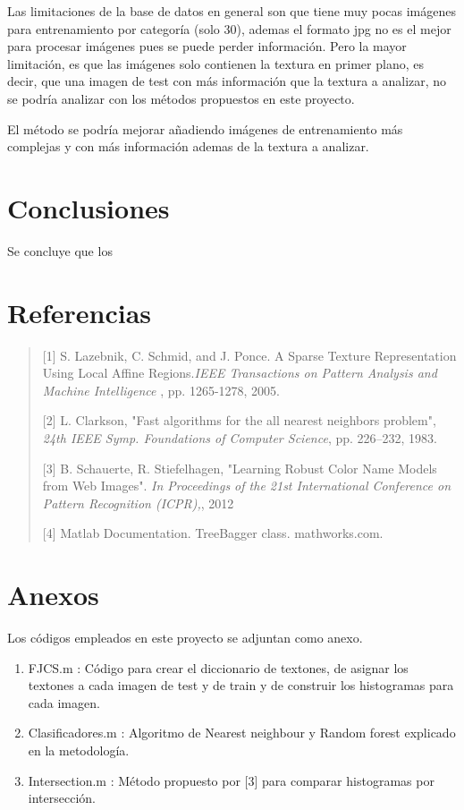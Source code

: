 \documentclass[10pt,twocolumn,letterpaper]{article}
\begin{document}
Las limitaciones de la base de datos en general son que tiene muy pocas imágenes para entrenamiento por categoría (solo 30), ademas el formato jpg no es el mejor para procesar imágenes pues se puede perder información. Pero la mayor limitación, es que las imágenes solo contienen la textura en primer plano, es decir, que una imagen de test con más información que la textura a analizar, no se podría analizar con los métodos propuestos en este proyecto.  

El método se podría mejorar añadiendo imágenes de entrenamiento más complejas y con más información ademas de la textura a analizar. 


\section{Conclusiones}

Se concluye que los 


\section{Referencias}

\begin{quote}
   
[1] S. Lazebnik, C. Schmid, and J. Ponce. A Sparse Texture Representation Using Local Affine Regions.\textit{IEEE Transactions on Pattern Analysis and Machine Intelligence} ,  pp. 1265-1278, 2005.
   
   [2] L. Clarkson, "Fast algorithms for the all nearest neighbors problem", \textit{24th IEEE Symp. Foundations of Computer Science}, pp. 226–232, 1983.
   
   [3] B. Schauerte, R. Stiefelhagen, "Learning Robust Color Name Models from Web Images". \textit{In Proceedings of the 21st International Conference on Pattern Recognition (ICPR),}, 2012
    
   [4] Matlab Documentation. TreeBagger class. mathworks.com.
   
\end{quote}

{\small


}
\section{Anexos}
Los códigos empleados en este proyecto se adjuntan como anexo.
\begin{enumerate}
\item FJCS.m : Código para crear el diccionario de textones, de asignar los textones a cada imagen de test y de train y de construir los histogramas para cada imagen.
\item Clasificadores.m : Algoritmo de Nearest neighbour y Random forest explicado en la metodología.
\item Intersection.m : Método propuesto por [3] para comparar histogramas por intersección. 

\end{enumerate}
\end{document}

